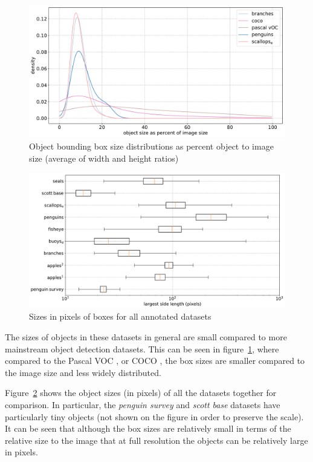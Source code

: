\begin{figure}[ht]
\centering
\includegraphics[width=1.0\linewidth]{charts/summaries/sizes_density.pdf}
\caption{Object bounding box size distributions as percent object to image size (average of width and height ratios) }
\label{fig:box_sizes}
\end{figure}
 

\begin{figure}[ht]
\centering
\includegraphics[width=1.0\linewidth]{charts/summaries/sizes_boxplot.pdf}
\caption{ Sizes in pixels of boxes for all annotated datasets }
\label{fig:box_sizes_plot}
\end{figure}

The sizes of objects in these datasets in general are small compared to more mainstream object detection datasets. This can be seen in figure~\ref{fig:box_sizes}, where compared to the Pascal VOC \cite{Everingham2008}, or COCO \cite{Lin2014}, the box sizes are smaller compared to the image size and less widely distributed. 

Figure~\ref{fig:box_sizes_plot}  shows the object sizes (in pixels) of all the datasets together for comparison. In particular, the \emph{penguin survey} and \emph{scott base} datasets have particularly tiny objects (not shown on the figure in order to preserve the scale). It can be seen that although the box sizes are relatively small in terms of the relative size to the image that at full resolution the objects can be relatively large in pixels.

